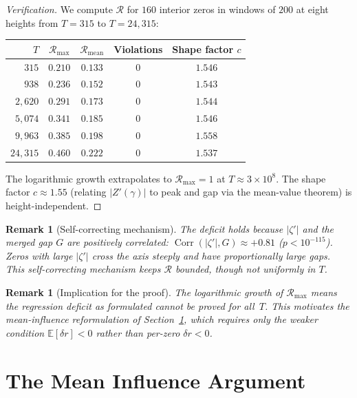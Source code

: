 \documentclass[11pt,a4paper]{article}
\newtheorem{remark}[theorem]{Remark}
\DeclareMathOperator{\Corr}{Corr}
\begin{document}
\begin{proof}[Verification]
We compute $\mathcal{R}$ for $160$ interior zeros in windows of $200$ at eight heights from $T = 315$ to $T = 24{,}315$:

\begin{center}
\begin{tabular}{rcccc}
\toprule
$T$ & $\mathcal{R}_{\max}$ & $\mathcal{R}_{\mathrm{mean}}$ & Violations & Shape factor $c$ \\
\midrule
$315$ & $0.210$ & $0.133$ & $0$ & $1.546$ \\
$938$ & $0.236$ & $0.152$ & $0$ & $1.543$ \\
$2{,}620$ & $0.291$ & $0.173$ & $0$ & $1.544$ \\
$5{,}074$ & $0.341$ & $0.185$ & $0$ & $1.546$ \\
$9{,}963$ & $0.385$ & $0.198$ & $0$ & $1.558$ \\
$24{,}315$ & $0.460$ & $0.222$ & $0$ & $1.537$ \\
\bottomrule
\end{tabular}
\end{center}

The logarithmic growth extrapolates to $\mathcal{R}_{\max} = 1$ at $T \approx 3 \times 10^8$.
The shape factor $c \approx 1.55$ (relating $|Z'(\gamma)|$ to peak and gap via the mean-value theorem) is height-independent.
\end{proof}

\begin{remark}[Self-correcting mechanism]
The deficit holds because $|\zeta'|$ and the merged gap $G$ are positively correlated: $\Corr(|\zeta'|, G) \approx +0.81$ ($p < 10^{-115}$).
Zeros with large $|\zeta'|$ cross the axis steeply and have proportionally large gaps.
This self-correcting mechanism keeps $\mathcal{R}$ bounded, though not uniformly in $T$.
\end{remark}

\begin{remark}[Implication for the proof]
The logarithmic growth of $\mathcal{R}_{\max}$ means the regression deficit \emph{as formulated} cannot be proved for all~$T$.
This motivates the mean-influence reformulation of Section~\ref{sec:influence}, which requires only the weaker condition $\mathbb{E}[\delta r] < 0$ rather than per-zero $\delta r < 0$.
\end{remark}


\section{The Mean Influence Argument}\label{sec:influence}
\end{document}
